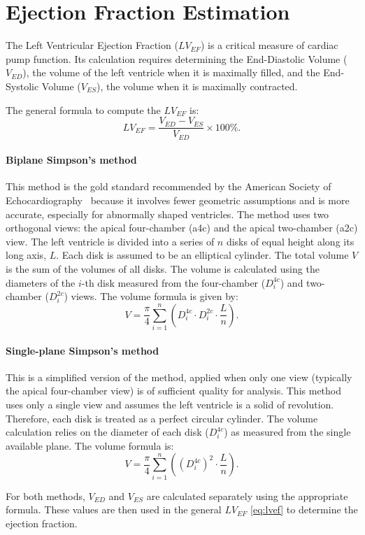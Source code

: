 \section{Ejection Fraction Estimation}
The Left Ventricular Ejection Fraction ($LV_{EF}$) is a critical measure of cardiac pump function. Its calculation requires determining the End-Diastolic Volume ($V_{ED}$), the volume of the left ventricle when it is maximally filled, and the End-Systolic Volume ($V_{ES}$), the volume when it is maximally contracted.

The general formula to compute the $LV_{EF}$ is:
\begin{equation}
   LV_{EF} = \frac{V_{ED} - V_{ES}}{V_{ED}} \times 100\%.
   \label{eq:lvef}
\end{equation}
%
\paragraph{Biplane Simpson's method}
This method is the gold standard recommended by the American Society of Echocardiography~\cite{LANG20151} because it involves fewer geometric assumptions and is more accurate, especially for abnormally shaped ventricles.
The method uses two orthogonal views: the apical four-chamber (a4c) and the apical two-chamber (a2c) view. The left ventricle is divided into a series of $n$ disks of equal height along its long axis, $L$.
Each disk is assumed to be an elliptical cylinder. The total volume $V$ is the sum of the volumes of all disks. The volume is calculated using the diameters of the $i$-th disk measured from the four-chamber ($D_i^{4c}$) and two-chamber ($D_i^{2c}$) views.
The volume formula is given by:
\begin{equation}
  V = \frac{\pi}{4} \sum_{i=1}^{n} \left( D_i^{4c} \cdot D_i^{2c} \cdot \frac{L}{n} \right).
  \label{eq:biplane}
\end{equation}
%
\paragraph{Single-plane Simpson's method}
This is a simplified version of the method, applied when only one view (typically the apical four-chamber view) is of sufficient quality for analysis.
This method uses only a single view and assumes the left ventricle is a solid of revolution. Therefore, each disk is treated as a perfect circular cylinder.
The volume calculation relies on the diameter of each disk ($D_i^{4c}$) as measured from the single available plane.
The volume formula is:
\begin{equation}
  V = \frac{\pi}{4} \sum_{i=1}^{n} \left( (D_i^{4c})^2 \cdot \frac{L}{n} \right).
  \label{eq:singleplane}
\end{equation}

For both methods, $V_{ED}$ and $V_{ES}$ are calculated separately using the appropriate formula. These values are then used in the general $LV_{EF}$ \cref{eq:lvef} to determine the ejection fraction.